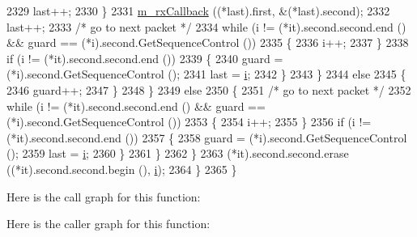 \begin{DoxyCode}
2329                       last++;
2330                     \}
2331                   \hyperlink{classns3_1_1MacLow_ac5f2b06b6151c99816c66b7bf946a4d8}{m\_rxCallback} ((*last).first, &(*last).second);
2332                   last++;
2333                   \textcolor{comment}{/* go to next packet */}
2334                   \textcolor{keywordflow}{while} (i != (*it).second.second.end () && guard == (*i).second.GetSequenceControl ())
2335                     \{
2336                       i++;
2337                     \}
2338                   \textcolor{keywordflow}{if} (i != (*it).second.second.end ())
2339                     \{
2340                       guard = (*i).second.GetSequenceControl ();
2341                       last = \hyperlink{bernuolliDistribution_8m_a6f6ccfcf58b31cb6412107d9d5281426}{i};
2342                     \}
2343                 \}
2344               \textcolor{keywordflow}{else}
2345                 \{
2346                   guard++;
2347                 \}
2348             \}
2349           \textcolor{keywordflow}{else}
2350             \{
2351               \textcolor{comment}{/* go to next packet */}
2352               \textcolor{keywordflow}{while} (i != (*it).second.second.end () && guard == (*i).second.GetSequenceControl ())
2353                 \{
2354                   i++;
2355                 \}
2356               \textcolor{keywordflow}{if} (i != (*it).second.second.end ())
2357                 \{
2358                   guard = (*i).second.GetSequenceControl ();
2359                   last = \hyperlink{bernuolliDistribution_8m_a6f6ccfcf58b31cb6412107d9d5281426}{i};
2360                 \}
2361             \}
2362         \}
2363       (*it).second.second.erase ((*it).second.second.begin (), \hyperlink{bernuolliDistribution_8m_a6f6ccfcf58b31cb6412107d9d5281426}{i});
2364     \}
2365 \}
\end{DoxyCode}


Here is the call graph for this function\+:




Here is the caller graph for this function\+:


